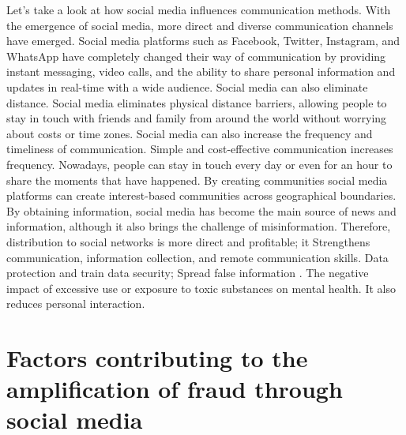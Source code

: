 \documentclass[man,floatsintext]{apa7}
\begin{document}
Let's take a look at how social media influences communication methods. With the emergence of social media, more direct and diverse communication channels have emerged. Social media platforms such as Facebook, Twitter, Instagram, and WhatsApp have completely changed their way of communication by providing instant messaging, video calls, and the ability to share personal information and updates in real-time with a wide audience. Social media can also eliminate distance. Social media eliminates physical distance barriers, allowing people to stay in touch with friends and family from around the world without worrying about costs or time zones. Social media can also increase the frequency and timeliness of communication. Simple and cost-effective communication increases frequency. Nowadays, people can stay in touch every day or even for an hour to share the moments that have happened. By creating communities social media platforms can create interest-based communities across geographical boundaries. By obtaining information, social media has become the main source of news and information, although it also brings the challenge of misinformation. Therefore, distribution to social networks is more direct and profitable; it Strengthens communication, information collection, and remote communication skills. Data protection and train data security; Spread false information \autocite{kumarFalseInformationWeb2018}. The negative impact of excessive use or exposure to toxic substances on mental health. It also reduces personal interaction.

\section{Factors contributing to the amplification of fraud through social media}
\end{document}
